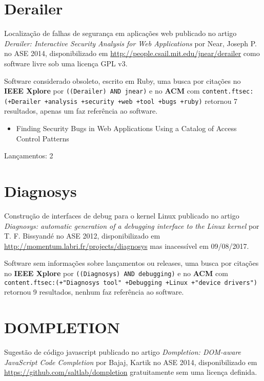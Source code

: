 \section{Derailer}

Localização de falhas de segurança em aplicações web
publicado no artigo {\it Derailer: Interactive Security Analysis for Web Applications}
por Near, Joseph P.
no ASE 2014,
disponibilizado em \url{http://people.csail.mit.edu/jnear/derailer}
como software livre
sob uma licença GPL v3.

Software considerado obsoleto,
escrito em Ruby,
uma busca por citações no {\bf IEEE Xplore} por
\texttt{((Derailer) AND jnear)}
e no {\bf ACM} com
\texttt{content.ftsec:(+Derailer +analysis +security +web +tool +bugs +ruby)}
retornou
7 resultados,
apenas um faz referência ao software.

\begin{itemize}
\item Finding Security Bugs in Web Applications Using a Catalog of Access Control Patterns
\end{itemize}

Lançamentos: 2

\section{Diagnosys}

Construção de interfaces de debug para o kernel Linux
publicado no artigo {\it Diagnosys: automatic generation of a debugging interface to the Linux kernel}
por T. F. Bissyandé
no ASE 2012,
disponibilizado em \url{http://momentum.labri.fr/projects/diagnosys}
mas inacessível em 09/08/2017.

Software sem informações sobre lançamentos ou releases,
uma busca por citações no {\bf IEEE Xplore} por
\texttt{((Diagnosys) AND debugging)}
e no {\bf ACM} com
\texttt{content.ftsec:(+"Diagnosys tool" +Debugging +Linux +"device drivers")}
retornou
9 resultados,
nenhum faz referência ao software.



\section{DOMPLETION}

Sugestão de código javascript
publicado no artigo {\it Dompletion: DOM-aware JavaScript Code Completion}
por Bajaj, Kartik
no ASE 2014,
disponibilizado em \url{https://github.com/saltlab/dompletion}
gratuitamente
sem uma licença definida.

